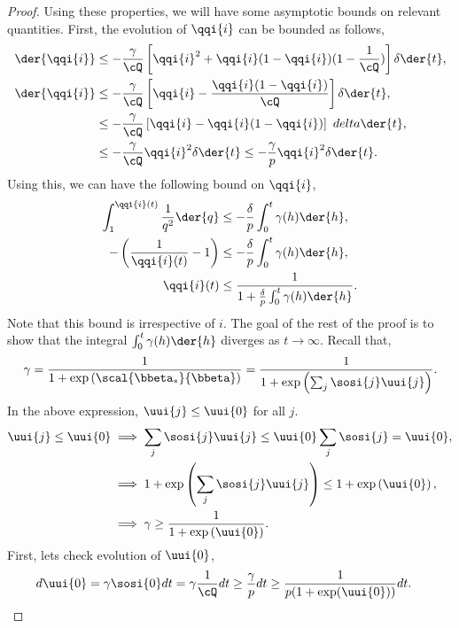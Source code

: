 \documentclass{article}
\theoremstyle{plain}
\theoremstyle{definition}
\theoremstyle{remark}
\begin{document}
\begin{proof}
Using these properties, we will have some asymptotic bounds on relevant quantities. First, the evolution of $\qqi{i}$ can be bounded as follows,
\begin{align*}
    \der{\qqi{i}} &\leq -  \frac{\gamma}{\cQ} \left[ \qqi{i}^2 + \qqi{i} (1 - \qqi{i}) ( 1 - \frac{1}{\cQ}) \right] \delta \der{t}, \\
    \der{\qqi{i}} &\leq - \frac{\gamma}{\cQ} \left[ \qqi{i} - \frac{\qqi{i}(1-\qqi{i})}{\cQ} \right] \delta \der{t} , \\
    &\leq -\frac{\gamma}{\cQ} \left[ \qqi{i} - \qqi{i}(1 - \qqi{i}) \right] \ delta \der{t}, \\
    &\leq - \frac{\gamma}{\cQ} \qqi{i}^2 \delta \der{t} \leq -  \frac{\gamma}{p} \qqi{i}^2 \delta \der{t}.
\end{align*} 
Using this, we can have the following bound on $\qqi{i}$,
\begin{align*}
    \int_{1}^{\qqi{i}(t)} \frac{1}{q^2} \der{q} &\leq - \frac{\delta}{p} \int_{0}^{t} \gamma(h) \der{h}, \\
    - \left( \frac{1}{\qqi{i}(t)} - 1 \right) &\leq - \frac{\delta}{p} \int_{0}^{t} \gamma(h) \der{h}, \\
    \qqi{i}(t) &\leq \frac{1}{1 + \frac{\delta}{p} \int_{0}^{t} \gamma(h) \der{h}}.
\end{align*}
Note that this bound is irrespective of $i$. The goal of the rest of the proof is to show that the integral $\int_{0}^{t} \gamma(h) \der{h}$ diverges as $t \to \infty$.
Recall that,
\begin{align*}
    \gamma = \frac{1}{1 + \exp\left(  \scal{\bbeta_*}{\bbeta}  \right)} = \frac{1}{1 + \exp\left(  \sum_{j} \sosi{j} \uui{j}  \right)}. 
\end{align*} 
In the above expression, $\uui{j} \leq \uui{0}$ for all $j$.
\begin{align*}
    \uui{j} \leq \uui{0} &\implies \sum_{j} \sosi{j} \uui{j} \leq \uui{0} \sum_{j} \sosi{j} = \uui{0}, \\
    &\implies 1 + \exp\left(  \sum_{j} \sosi{j} \uui{j}  \right) \leq 1 + \exp\left(  \uui{0}  \right), \\
    &\implies \gamma \geq \frac{1}{1 + \exp\left(  \uui{0}  \right)}.
\end{align*}
First, lets check evolution of $\uui{0}$, 
\begin{align*}
    d{\uui{0}} &=  \gamma  \sosi{0} dt =  \gamma \frac{1}{\cQ} d{t} \geq \frac{\gamma}{p} d{t} \geq \frac{1}{p(1 + \exp( \uui{0} ))} d{t}.
\end{align*}

\end{proof}
\end{document}
